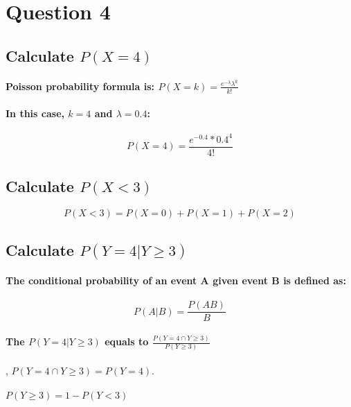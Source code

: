 \section{Question 4}
\subsection{Calculate $P(X=4)$}
\paragraph{Poisson probability formula is: $ P(X=k)=\frac{e^{- \lambda} \lambda^k}{k!} $}
\paragraph{In this case, $k=4$ and $\lambda=0.4$:}
$$ P(X=4)=\frac{e^{-0.4}*0.4^4}{4!} $$
\subsection{Calculate $P(X<3)$}
$$ P(X<3)=P(X=0)+P(X=1)+P(X=2)$$
\subsection{Calculate $P(Y=4 | Y \ge 3)$}
\paragraph{The conditional probability of an event A given event B is defined as:}
$$ P(A|B)=\frac{P(AB)}{B}$$
\paragraph{The $P(Y=4 | Y \ge 3)$ equals to $\frac{P(Y=4 \cap Y \ge 3)}{P(Y \ge 3)}$}, $P(Y=4 \cap Y \ge 3) = P(Y=4)$.
\paragraph{$P(Y \ge 3)=1-P(Y < 3)$}